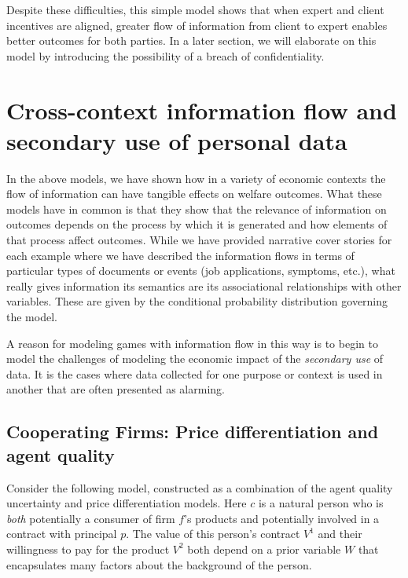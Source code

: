 \documentclass[../thesis.tex]{subfiles}
\begin{document}
Despite these difficulties, this simple model
shows that when expert and client incentives
are aligned, greater flow of information
from client to expert enables better outcomes
for both parties.
In a later section, we will elaborate
on this model by introducing the possibility
of a breach of confidentiality.

\section{Cross-context information flow and secondary use of personal data}
\label{sec:cross-context}

In the above models, we have shown how in
a variety of economic contexts the flow of information
can have tangible effects on welfare outcomes.
What these models have in common is that they show
that the relevance of information on outcomes depends
on the process by which it is generated and how
elements of that process affect outcomes.
While we have provided narrative cover stories for
each example where we have described the information
flows in terms of particular types of documents or events
(job applications, symptoms, etc.), what really gives
information its semantics are its associational
relationships with other variables.
These are given by the conditional probability
distribution governing the model.

A reason for modeling games with information flow in
this way is to begin to model the challenges of modeling
the economic impact of the \emph{secondary use} of data.
It is the cases where data collected for one purpose or context
is used in another that are often presented as alarming.

\subsection{Cooperating Firms: Price differentiation and agent quality}
\label{sec:cooperating-firms}

Consider the following model, constructed as a combination
of the agent quality uncertainty and price differentiation
models.
Here $c$ is a natural person who is \emph{both} potentially
a consumer of firm $f$'s products and potentially involved
in a contract with principal $p$.
The value of this person's contract $V^1$ and their
willingness to pay for the product $V^2$ both depend on
a prior variable $W$ that encapsulates many factors about
the background of the person.
\end{document}
